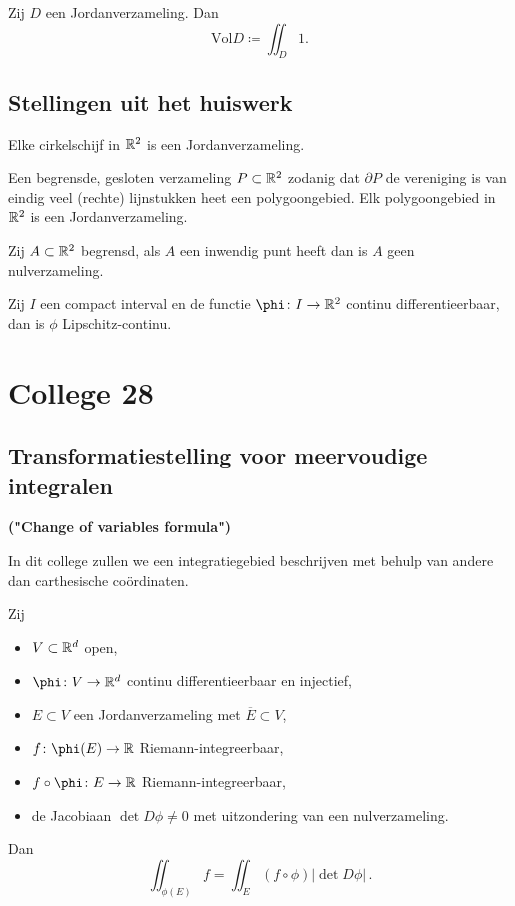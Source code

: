 \documentclass{2wa40summary}
\begin{document}
	    \begin{define}
	    	Zij $D$ een Jordanverzameling. Dan
	    	\[ 
		    	\text{Vol}D \coloneqq  \iint_D 1.
	    	 \]
	    \end{define}
	    
	    \subsection{Stellingen uit het huiswerk}
	    
	    \begin{theorem}
	    	Elke cirkelschijf in $\mathbb{R}^2$ is een Jordanverzameling.
	    \end{theorem}
	    \begin{theorem}
	    	Een begrensde, gesloten verzameling $P \subset \mathbb{R}^2$ zodanig dat $\partial P$ de vereniging is van eindig veel (rechte) lijnstukken heet een polygoongebied.  
	    	Elk polygoongebied in $\mathbb{R}^2$ is een Jordanverzameling.
	    \end{theorem}
	    \begin{theorem}
	    	Zij $A \subset \mathbb{R}^2$ begrensd, als $A$ een inwendig punt heeft dan is $A$ geen nulverzameling.
	    \end{theorem}
	    \begin{theorem}
	    	Zij $I$ een compact interval en de functie $\phi \: I \to \reals^2$ continu differentieerbaar, dan is $\phi$ Lipschitz-continu.
	    \end{theorem}
	    
	    \newpage
	    \section{College 28}
	    \subsection{Transformatiestelling voor meervoudige integralen}
	    \textbf{("Change of variables formula")}
	    
	    In dit college zullen we een integratiegebied beschrijven met behulp van andere dan carthesische co\"ordinaten.
	    
	    \begin{theorem}
	    	Zij 
	    	\begin{itemize}
		    	\item $V \subset \mathbb{R}^d$ open,
		    	\item $\phi \: V \to \reals^d$ continu differentieerbaar en injectief,
		    	\item $E \subset V$ een Jordanverzameling met $\overline{E} \subset V$,
		    	\item $f \: \phi(E) \to \reals$ Riemann-integreerbaar,
		    	\item $f \circ \phi \: E \to \reals$ Riemann-integreerbaar,
		    	\item de Jacobiaan $\det D\phi \neq 0$ met uitzondering van een nulverzameling.
	    	\end{itemize}
	    	Dan 
	    	\[ 
		    	\iint_{\phi(E)} f = \iint_E (f \circ \phi) |\det D\phi| \,.
	    	 \]
	    \end{theorem}
	    
\end{document}
